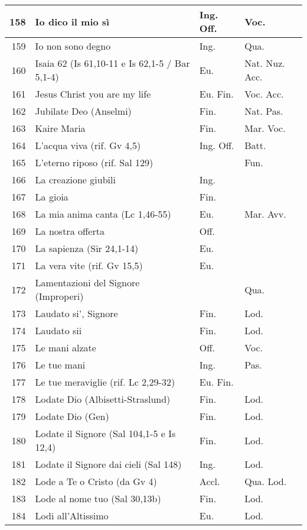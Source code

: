 {\begin{center}
\begin{longtable}{ | r | m{4.7cm} | m{1.8cm} | m{2cm}  |}
    158 & Io dico il mio sì & Ing. Off. & Voc.\\ \hline
    159 & Io non sono degno & Ing. & Qua.\\ \hline
    160 & Isaia 62 (Is 61,10-11 e Is 62,1-5 / Bar 5,1-4) & Eu. & Nat. Nuz. Acc.\\ \hline
    161 & Jesus Christ you are my life & Eu. Fin. & Voc. Acc.\\ \hline
    162 & Jubilate Deo (Anselmi) & Fin. & Nat. Pas.\\ \hline
    163 & Kaire Maria & Fin. & Mar. Voc.\\ \hline
    164 & L'acqua viva (rif. Gv 4,5) & Ing. Off. & Batt.\\ \hline
    165 & L'eterno riposo (rif. Sal 129) &  & Fun.\\ \hline
    166 & La creazione giubili & Ing. & \\ \hline
    167 & La gioia & Fin. & \\ \hline
    168 & La mia anima canta (Lc 1,46-55) & Eu. & Mar. Avv.\\ \hline
    169 & La nostra offerta & Off. & \\ \hline
    170 & La sapienza (Sir 24,1-14) & Eu. & \\ \hline
    171 & La vera vite (rif. Gv 15,5) & Eu. & \\ \hline
    172 & Lamentazioni del Signore (Improperi) &  & Qua.\\ \hline
    173 & Laudato si', Signore & Fin. & Lod.\\ \hline
    174 & Laudato sii & Fin. & Lod.\\ \hline
    175 & Le mani alzate & Off. & Voc.\\ \hline
    176 & Le tue mani & Ing. & Pas.\\ \hline
    177 & Le tue meraviglie (rif. Lc 2,29-32) & Eu. Fin. & \\ \hline
    178 & Lodate Dio (Albisetti-Straslund) & Fin. & Lod.\\ \hline
    179 & Lodate Dio (Gen) & Fin. & Lod.\\ \hline
    180 & Lodate il Signore (Sal 104,1-5 e Is 12,4) & Fin. & Lod.\\ \hline
    181 & Lodate il Signore dai cieli (Sal 148) & Ing. & Lod.\\ \hline
    182 & Lode a Te o Cristo (da Gv 4) & Accl. & Qua. Lod.\\ \hline
    183 & Lode al nome tuo (Sal 30,13b) & Fin. & Lod.\\ \hline
    184 & Lodi all'Altissimo & Eu. & Lod.\\ \hline

\end{longtable}
\end{center}}
